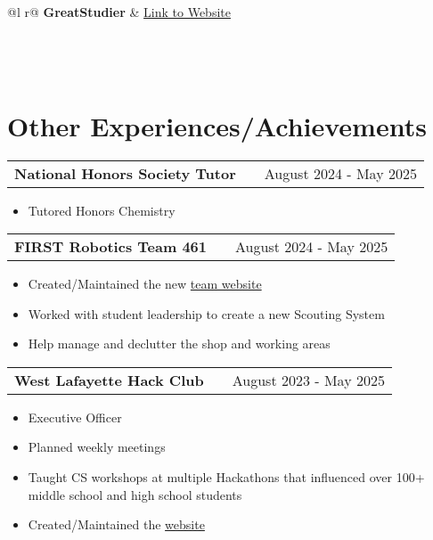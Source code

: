 \documentclass[letter, 12pt]{article}
\makeatletter
\newenvironment{jobshort}[2]
    {
    \begin{tabularx}{\linewidth}{@{}l X r@{}}
    \textbf{#1} & \hfill & #2 \\[3.75pt]
    \end{tabularx}
    }
    {
    }
\makeatother
\begin{document}
\begin{tabularx}{\linewidth}{ @{}l r@{} }
    \textbf{GreatStudier} & \hfill \href{https://github.com/greatericontop/GreatStudier}{Link to Website} \\[3.75pt]
     \\
     \\
     \\
\end{tabularx}

\section{Other Experiences/Achievements}

\begin{jobshort}{National Honors Society Tutor}{August 2024 - May 2025}
    \begin{itemize}
        \item Tutored Honors Chemistry
    \end{itemize}
\end{jobshort}

\begin{jobshort}{FIRST Robotics Team 461}{August 2024 - May 2025}
    \begin{itemize}
        \item Created/Maintained the new \href{https://boilerinvasion.org/}{team website}
        \item Worked with student leadership to create a new Scouting System
        \item Help manage and declutter the shop and working areas
    \end{itemize}
\end{jobshort}

\begin{jobshort}{West Lafayette Hack Club}{August 2023 - May 2025}
    \begin{itemize}
        \item Executive Officer
        \item Planned weekly meetings
        \item Taught CS workshops at multiple Hackathons that influenced over 100+ middle school and high school students
        \item Created/Maintained the \href{https://wl.hackclub.com/}{website}
    \end{itemize}
\end{jobshort}
\end{document}
